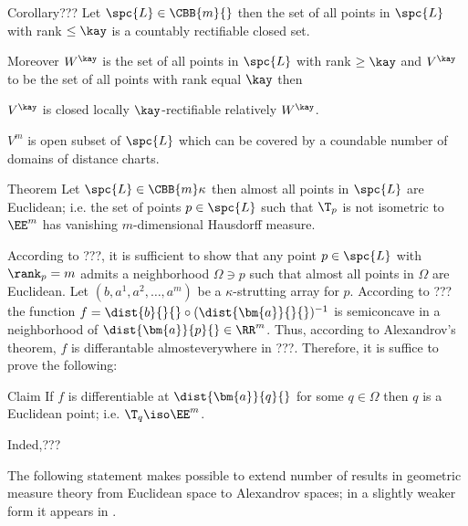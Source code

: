 \begin{thm}{Corollary???}
Let $\spc{L}\in\CBB{m}{}$
then the set of all points in $\spc{L}$ with rank $\le \kay$
is a countably rectifiable closed set.

Moreover $W^{\kay}$ is the set of all points in $\spc{L}$ with rank $\ge\kay$ and $V^\kay$ to be the set of all points with rank equal $\kay$ then

\begin{subthm}{}
$V^\kay$ is closed locally $\kay$-rectifiable relatively $W^\kay$.
\end{subthm}

\begin{subthm}{}
$V^m$ is open subset of $\spc{L}$ which can be covered by a coundable number of domains of distance charts.
\end{subthm}

\end{thm}











\begin{thm}{Theorem}
Let $\spc{L}\in\CBB{m}\kappa$ then almost all points in $\spc{L}$ are Euclidean;
i.e. the set of points $p\in \spc{L}$ such that $\T_p$ is not isometric to $\EE^m$ has vanishing $m$-dimensional Hausdorff measure.
\end{thm}

According to ???, it is sufficient to show that any point 
$p\in\spc{L}$ 
 with $\rank_p=m$ admits a neighborhood $\Omega\ni p$
such that almost  all points in $\Omega$ are Euclidean.
Let $(b,a^1,a^2,\dots,a^m)$ be a $\kappa$-strutting array for $p$.
According to ???
the function $f=\dist{b}{}{}\circ(\dist{\bm{a}}{}{})^{-1}$ is semiconcave in a neighborhood of $\dist{\bm{a}}{p}{}\in\RR^m$.
Thus, according to Alexandrov's theorem,
$f$ is differantable almosteverywhere in ???.
Therefore, it is suffice to prove the following:

\begin{clm}{Claim}
If $f$ is differentiable at $\dist{\bm{a}}{q}{}$ for some $q\in \Omega$ then $q$ is a Euclidean point; i.e. $\T_q\iso\EE^m$.
\end{clm}

Inded,???
\claimqeds






The following statement makes possible to extend number of results in geometric measure theory from Euclidean space to Alexandrov spaces;
in a slightly weaker form it appears in  \cite[???]{BGP}.

